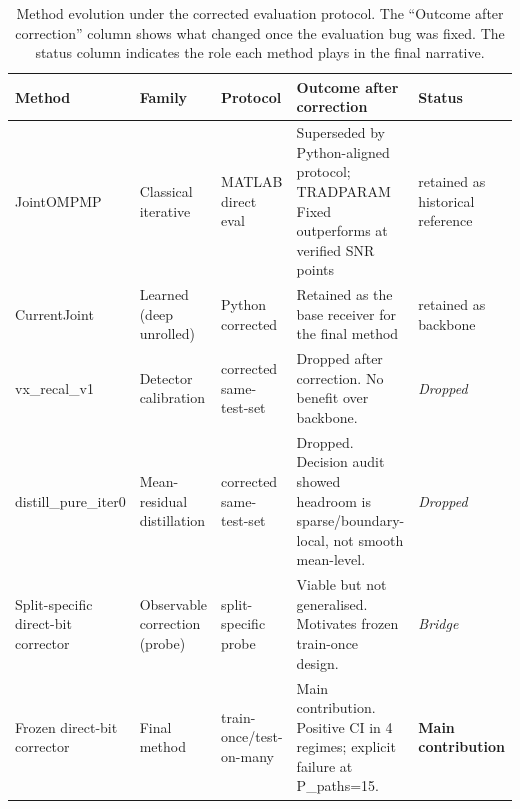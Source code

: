 \begin{table}[t]
\centering
\caption{Method evolution under the corrected evaluation protocol. The ``Outcome after correction'' column shows what changed once the evaluation bug was fixed. The status column indicates the role each method plays in the final narrative.}
\label{tab:fyp_method_evolution}
\setlength{\tabcolsep}{4pt}
\begin{tabular}{p{2.4cm}p{2.0cm}p{2.4cm}p{3.6cm}p{3.0cm}}
\toprule
\textbf{Method} & \textbf{Family} & \textbf{Protocol} & \textbf{Outcome after correction} & \textbf{Status} \\
\midrule
JointOMPMP & Classical iterative & MATLAB direct eval & Superseded by Python-aligned protocol; TRADPARAM Fixed outperforms at verified SNR points & retained as historical reference \\
CurrentJoint & Learned (deep unrolled) & Python corrected & Retained as the base receiver for the final method & retained as backbone \\
vx\_recal\_v1 & Detector calibration & corrected same-test-set & Dropped after correction. No benefit over backbone. & \textit{Dropped} \\
distill\_pure\_iter0 & Mean-residual distillation & corrected same-test-set & Dropped. Decision audit showed headroom is sparse/boundary-local, not smooth mean-level. & \textit{Dropped} \\
Split-specific direct-bit corrector & Observable correction (probe) & split-specific probe & Viable but not generalised. Motivates frozen train-once design. & \textit{Bridge} \\
Frozen direct-bit corrector & Final method & train-once/test-on-many & Main contribution. Positive CI in 4 regimes; explicit failure at P\_paths=15. & \textbf{Main contribution} \\
\bottomrule
\end{tabular}
\end{table}
